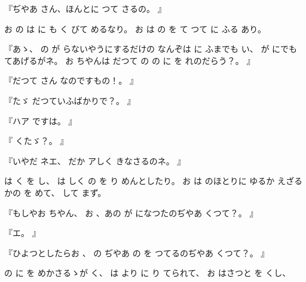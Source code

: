 
『ぢやあ
さん、ほんとに
つて
さるの。
』

お
の
は
に
も
く
びて
めるなり。
お
は
の
を
て
つて
に
ふる
あり。

『あゝ、
の
が
らないやうにするだけの
なんぞは
に
ふまでも
い、
が
にでも
てあげるがネ。
お
ちやんは
だつて
の
の
に
を
れのだらう？。
』

『だつて
さん
なのですもの！。%
』

『たゞ
だつていふばかりで？。%
』

『ハア
ですは。
』

『
くたゞ？。
』

『いやだ
ネエ、
だか
アしく
きなさるのネ。
』

は
く
を
し、
は
しく
の
を
り
めんとしたり。
お
は
のほとりに
ゆるか
えざるかの
を
めて、
して
まず。

『もしやお
ちやん、
お
、あの
が
になつたのぢやあ
くつて？。
』

『エ。
』

『ひよつとしたらお
、
の
ぢやあ
の
を
つてるのぢやあ
くつて？。
』

の
に
を
めかさるゝが
く、
は
より
に
り
てられて、
お
はさつと
を
くし、

